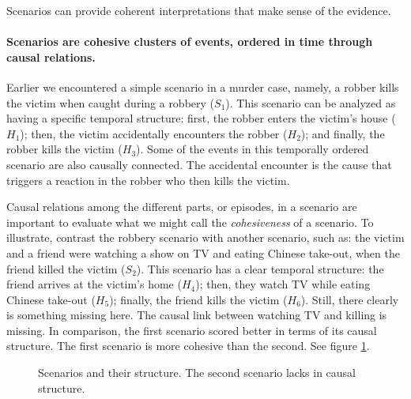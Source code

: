 \documentclass[10pt]{article}
\begin{document}

Scenarios can provide coherent interpretations that make sense of the evidence.
  
\paragraph{Scenarios are cohesive clusters 
of events, ordered in time through causal relations.} 
Earlier we encountered a simple scenario in a murder case, namely, 
a robber kills the victim when caught during a robbery ($S_1$). This scenario 
can be analyzed as having a specific 
temporal structure:
first, the robber enters the victim's house ($H_1$); then, the victim accidentally encounters the robber ($H_2$); and finally, 
the robber kills the victim ($H_3$). Some of the events in this temporally 
ordered scenario are also causally connected. %
The accidental encounter is the cause that triggers a reaction 
in the robber who then kills the victim. 

Causal relations among the different parts, or episodes, 
in a scenario are important to evaluate what we might 
call the \textit{cohesiveness} of a scenario. To illustrate, contrast the robbery scenario 
with another scenario, such as: the 
victim and a friend were watching a show on TV and eating Chinese take-out, 
when the friend killed the victim ($S_2$). 
This scenario has a clear temporal structure: the friend arrives at the victim's home ($H_4$); then, 
they watch TV while eating Chinese take-out ($H_5$); finally, the friend kills the victim ($H_6$). 
Still, there clearly is something missing here. 
The causal link between watching TV and killing is missing. 
In comparison, the first scenario scored better in terms 
of its causal structure. The first scenario 
is more cohesive than the second.  See figure \ref{fig:scens}.

\begin{figure}[bt]
\centering

\caption{Scenarios and their structure\label{fig:scens}. 
The second scenario lacks in causal structure.}
\end{figure}
\end{document}
